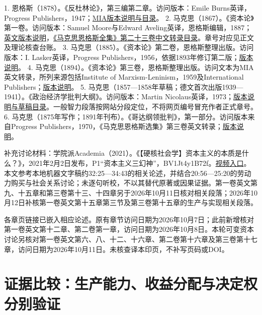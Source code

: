 \documentclass[UTF8,fontset=windows,12pt,a4paper,oneside,openany]{ctexbook}
\begin{document}
1. 恩格斯（1878）。《反杜林论》，第三编第二章。访问版本：Emile Burns英译，Progress Publishers，1947；\href{https://www.marxists.org/archive/marx/works/1877/anti-duhring/index.htm}{MIA版本说明与目录}。
2. 马克思（1867）。《资本论》第一卷。访问版本：Samuel Moore与Edward Aveling英译，恩格斯编辑，1887；\href{https://www.marxists.org/archive/marx/works/1867-c1/index.htm}{英文版本说明}，\href{https://www.marxists.org/chinese/marx-engels/23/index.htm}{《马克思恩格斯全集》第二十三卷中文转录目录}。章号对应见正文及理论核查台账。
3. 马克思（1885）。《资本论》第二卷，恩格斯整理出版。访问版本：I. Lasker英译，Progress Publishers，1956，依据1893年修订第二版；\href{https://www.marxists.org/archive/marx/works/1885-c2/index.htm}{版本说明}。
4. 马克思（1894）。《资本论》第三卷，恩格斯整理出版。访问文本为MIA英文转录，所列来源包括Institute of Marxism-Leninism，1959及International Publishers；\href{https://www.marxists.org/archive/marx/works/1894-c3/index.htm}{版本说明}。
5. 马克思（1857—1858年草稿；德文首次出版1939—1941）。《政治经济学批判大纲》。访问版本：Martin Nicolaus英译，1973；\href{https://www.marxists.org/archive/marx/works/1857/grundrisse/index.htm}{版本说明与草稿目录}。一般智力段落按网站分段定位，不将网页编号冒充作者正式章号。
6. 马克思（1875年写作；1891年刊布）。《哥达纲领批判》，第一部分。访问版本来自Progress Publishers，1970，《马克思恩格斯选集》第三卷英文转录；\href{https://www.marxists.org/archive/marx/works/1875/gotha/index.htm}{版本说明}。

补充讨论材料：学院派Academia（2021）。《【硬核社会学】资本主义的本质是什么？》，2021年2月2日发布，P1“资本主义三幻神”，BV1Jt4y1B72f。\href{https://www.bilibili.com/video/BV1Jt4y1B72f/}{视频入口}。本文参考本地机器文字稿约32:25—34:43的相关论述，并结合20:56—25:20的劳动力购买与社会关系讨论；未逐句听校，不以其替代原著或因果证据。第一卷英文第九、十五章和第三卷第十三、十四章另于2026年10月11日核对相关段落；2026年10月12日补核第一卷英文第十五章第三节及第三卷第十五章的生产与实现相关段落。

各章页链接已嵌入相应论述。原有章节访问日期为2026年10月7日；此前新增核对第一卷英文第十二章、第二卷第一章，访问日期为2026年10月8日。本轮可变资本讨论另核对第一卷英文第六、八、十二、十六章、第二卷第十六章及第三卷第十七章，访问日期为2026年10月11日。未核查译本印页，不补写页码或DOI。


\chapter{证据比较：生产能力、收益分配与决定权分别验证}\label{ch:3}
\end{document}
